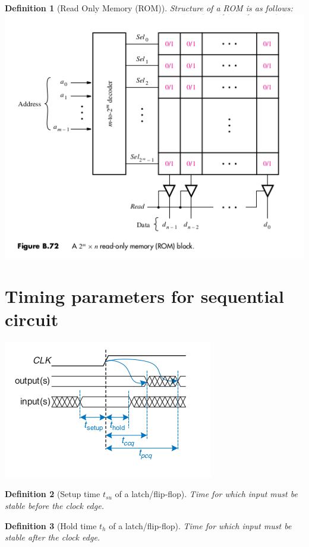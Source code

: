 \documentclass{article}
\newtheorem{definition}{Definition}
\begin{document}
\begin{definition}[Read Only Memory (ROM)] Structure of a ROM is as follows:\\
  \includegraphics[width=\linewidth]{./media/rom.png}
\end{definition}

\section{Timing parameters for sequential circuit~\cite[Section~3.5]{harris2022digital}}

\includegraphics[width=0.6\linewidth]{./media/ff-timings.png}
\begin{definition}[Setup time $t_{su}$ of a latch/flip-flop]
  Time for which input must be stable before the clock edge.
\end{definition}

\begin{definition}[Hold time $t_h$ of a latch/flip-flop]
  Time for which input must be stable after the clock edge.
\end{definition}
\end{document}
